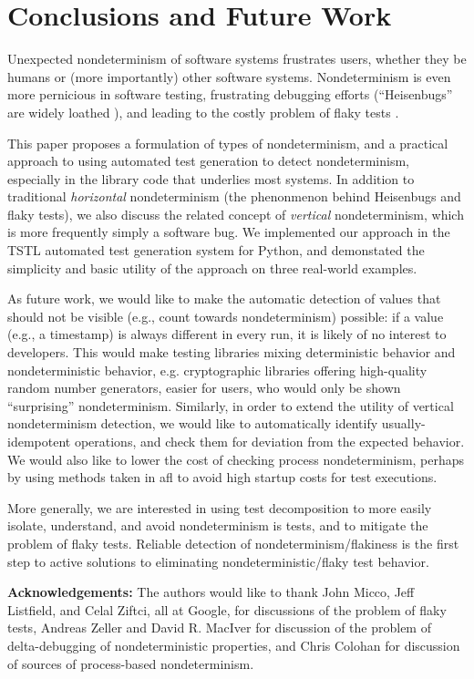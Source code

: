 \section{Conclusions and Future Work}

Unexpected nondeterminism of software systems frustrates users,
whether they be humans or (more importantly) other software systems.
Nondeterminism is even more pernicious in software testing,
frustrating debugging efforts (``Heisenbugs'' are widely loathed \cite{Heisenbug}), and
leading to the costly problem of flaky tests
\cite{miccoflaky,listfieldtestanalysis}.

This paper proposes a formulation of types of nondeterminism, and a
practical approach to using automated test generation to detect
nondeterminism, especially in the library code that underlies most
systems. In addition to traditional \emph{horizontal} nondeterminism
(the phenonmenon behind Heisenbugs and flaky tests), we also discuss
the related concept of \emph{vertical} nondeterminism, which is more
frequently simply a software bug.  We implemented our approach in the
TSTL automated test generation system for Python, and demonstated the
simplicity and basic utility of the approach on three real-world examples.

As future work, we would like to make the automatic detection of
values that should not be visible (e.g., count towards nondeterminism)
possible: if a value (e.g., a timestamp) is always different in every
run, it is likely of no interest to developers.  This would make
testing libraries mixing deterministic behavior and nondeterministic
behavior, e.g. cryptographic libraries offering high-quality random
number generators, easier for users, who would only be shown
``surprising'' nondeterminism.  Similarly, in order to extend the
utility of vertical nondeterminism detection, we would like to
automatically identify usually-idempotent operations, and check them
for deviation from the expected behavior.  We would also like to lower the cost
of checking process nondeterminism, perhaps by using methods taken in
afl \cite{aflfuzz} to avoid high startup costs for test executions.

More generally, we are interested in using test decomposition
\cite{Composition} to more easily isolate, understand, and avoid
nondeterminism is tests, and to mitigate the problem of flaky tests.
Reliable detection of nondeterminism/flakiness is the first step to
active solutions to eliminating nondeterministic/flaky test behavior.

{\scriptsize {\bf Acknowledgements:}  The authors would like to thank John Micco,
Jeff Listfield, and Celal Ziftci, all at Google, for discussions of
the problem of flaky tests, Andreas Zeller and David R. MacIver for discussion of the
problem of delta-debugging of nondeterministic properties, and Chris
Colohan for discussion of sources of process-based nondeterminism.}